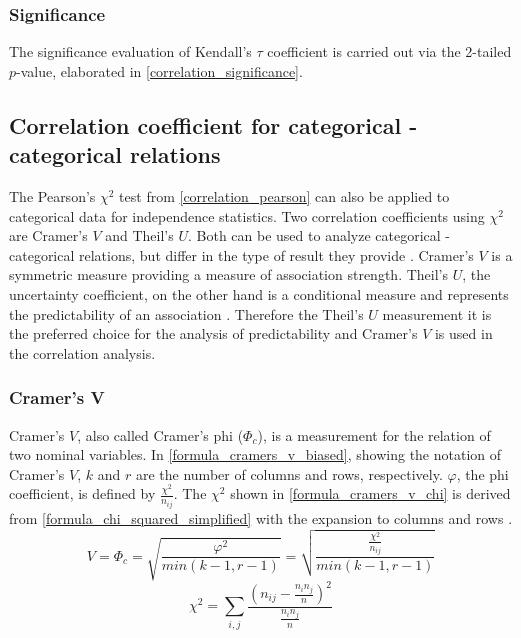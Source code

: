 \subsubsection{Significance}
The significance evaluation of Kendall's $\tau$ coefficient is carried out via the 2-tailed $p$-value, elaborated in \cref{correlation_significance}.

\subsection{Correlation coefficient for categorical - categorical relations}
The Pearson's $\chi^2$ test from \cref{correlation_pearson} can also be applied to categorical data for independence statistics. Two correlation coefficients using $\chi^2$ are Cramer’s $V$ and Theil’s $U$. Both can be used to analyze categorical - categorical relations, but differ in the type of result they provide \parencite{OutsideTwoStandardDeviations2018}. Cramer’s $V$ is a symmetric measure providing a measure of association strength. Theil’s $U$, the uncertainty coefficient, on the other hand is a conditional measure and represents the predictability of an association \parencite{Akoglu2018,StackExchange2020}. Therefore the Theil’s $U$ measurement it is the preferred choice for the analysis of predictability and Cramer’s $V$ is used in the correlation analysis.

\subsubsection{Cramer’s V}

Cramer’s $V$, also called Cramer's phi ($\Phi_c$), is a measurement for the relation of two nominal variables. In \cref{formula_cramers_v_biased}, showing the notation of Cramer’s $V$, $k$ and $r$ are the number of columns and rows, respectively. $\varphi$, the phi coefficient, is defined by $\frac{{\chi^2}}{n_{ij}}$. The $\chi^2$ shown in \cref{formula_cramers_v_chi} is derived from \cref{formula_chi_squared_simplified} with the expansion to columns and rows \parencite{Sheskin1997,Bergsma2013}.
\smallskip
\begin{equation}
\label{formula_cramers_v_biased}
	V = \Phi_c =  \sqrt{\frac{{\varphi^2}}{min(k-1,r-1)}} = \sqrt{\frac{\frac{{\chi^2}}{n_{ij}}}{min(k-1,r-1)}}
\end{equation}
\begin{equation}
\label{formula_cramers_v_chi}
	\chi^2 =  \sum_{i,j}{\frac{\left(n_{ij}-\frac{n_i n_j}{n}\right)^2}{\frac{n_i n_j}{n}}}
\end{equation}

